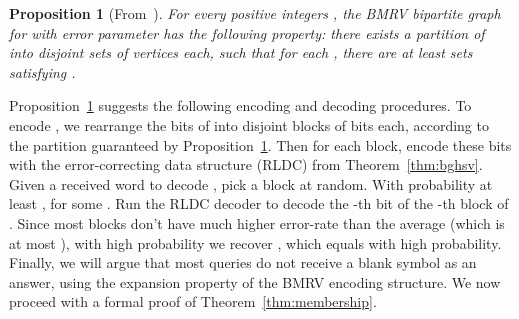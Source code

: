 \documentclass[11pt,english]{article}
\newtheorem{prop}[theorem]{Proposition}
\theoremstyle{definition}
\theoremstyle{remark}
\begin{document}
\begin{prop}[From~\cite{wolf:ecdata}]\label{prop:balls vs bins}
For every positive integers , the BMRV bipartite graph 
for  with error parameter  has the following
property: there exists a partition of  into 
disjoint sets  of  vertices each, such
that for each , there are at least  sets 
satisfying . \end{prop}

Proposition~\ref{prop:balls vs bins} suggests the following encoding
and decoding procedures. To encode , we rearrange the  bits
of  into  disjoint blocks of 
bits each, according to the partition guaranteed by Proposition~\ref{prop:balls vs bins}.
Then for each block, encode these bits with the error-correcting
data structure (RLDC) from Theorem~\ref{thm:bghsv}. Given a received word  to decode , pick a block 
at random. With probability at least , 
for some . Run the RLDC decoder to decode the -th bit of the
-th block of . Since most blocks don't have much higher error-rate
than the average (which is at most ), with high probability
we recover , which equals  with high probability.
Finally, we will argue that most queries do not receive a blank symbol
 as an answer, using the expansion property
of the BMRV encoding structure. We now proceed with a formal proof
of Theorem~\ref{thm:membership}.
\end{document}
